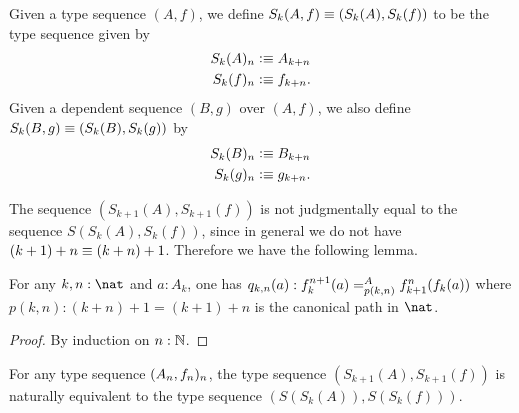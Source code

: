 \begin{defn}
Given a type sequence $(A,f)$, we define $S_k(A,f)\jdeq(S_k(A),S_k(f))$ to be the type sequence given by
\begin{align*}
S_k(A)_n & \defeq A_{k+n} \\
S_k(f)_n & \defeq f_{k+n}.
\end{align*}
Given a dependent sequence $(B,g)$ over $(A,f)$, we also define $S_k(B,g)\jdeq (S_k(B),S_k(g))$ by 
\begin{align*}
S_k(B)_n & \defeq B_{k+n} \\
S_k(g)_n & \defeq g_{k+n}.
\end{align*}
\end{defn}

The sequence $(S_{k+1}(A),S_{k+1}(f))$ is not judgmentally equal to the sequence $S(S_k(A),S_k(f))$, since in general we do not have $(k+1)+n\jdeq (k+n)+1$. Therefore we have the following lemma.

\begin{lem}\label{lem:iterate_succ}
For any $k,n:\nat$ and $a : A_k$, one has $q_{k,n}(a):\dpath{A}{p(k,n)}{f_k^{n+1}(a)}{f_{k+1}^n(f_k(a))}$ where $p(k,n):(k+n)+1=(k+1)+n$ is the canonical path in $\nat$.
\end{lem}

\begin{proof}
By induction on $n:\N$.
\end{proof}

\begin{cor}
For any type sequence $\sequence{A}{f}$, the type sequence $(S_{k+1}(A),S_{k+1}(f))$ is naturally equivalent to the type sequence $(S(S_k(A)),S(S_k(f)))$. 
\end{cor}

\begin{comment}
\begin{defn}
A \define{dependent natural transformation} $\tau:\sequence{P}{f}\to\sequence{Q}{g}$ of
dependent sequences over $\sequence{A}{a}$ consists of functions
$\tau_n(x):P_n(x)\to Q_n(x)$ for each $x:A_n$, together with a term witnessing 
that any square of the form
\begin{equation*}
\begin{tikzcd}
P_n(x) \arrow[r,"f_n(x)"] \arrow[d,swap,"\tau_n(x)"] & P_{n+1}(a(x)) \arrow[d,"\tau_{n+1}(a(x))"] \\
Q_n(x) \arrow[r,"g_n(x)"] & Q_{n+1}(a(x))
\end{tikzcd}
\end{equation*}
commutes. A \define{dependent natural equivalence} is a dependent natural transformation
$\tau$ for which $\tau_n(x)$ is an equivalence for each $n:\nat$ and $x:A_n$.
\end{defn}

\begin{lem}
For any two dependent sequences $\sequence{P}{f}$ and $\sequence{Q}{g}$ over
$\sequence{A}{a}$, the function
\begin{equation*}
(\id{\sequence{P}{f}}{\sequence{Q}{g}})\to\mathsf{NatEq}_{\sequence{A}{a}}(\sequence{P}{f},\sequence{Q}{g})
\end{equation*}
is an equivalence.
\end{lem}
\end{comment}

